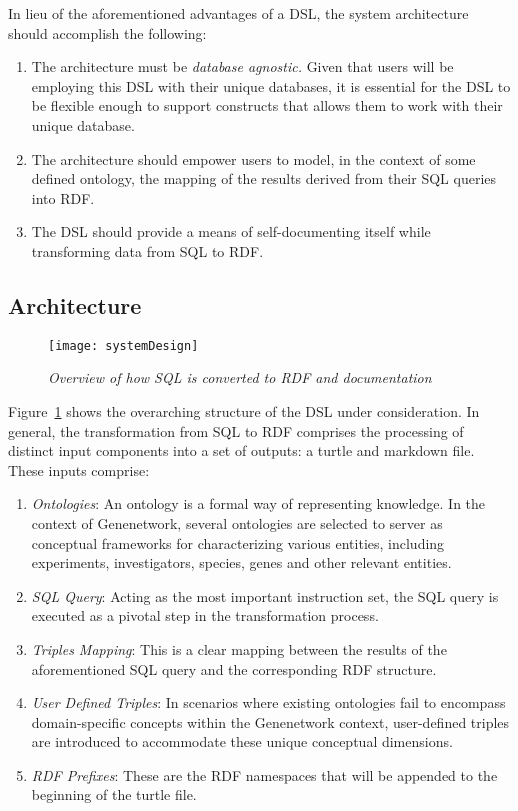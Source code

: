 In lieu of the aforementioned advantages of a DSL, the system architecture should accomplish the following:

\begin{enumerate}
\item The architecture must be \textit{database agnostic.}  Given that users will be employing this DSL with their unique databases, it is essential for the DSL to be flexible enough to support constructs that allows them to work with their unique database.
\item The architecture should empower users to model, in the context of some defined ontology, the mapping of the results derived from their SQL queries into RDF\@.
\item The DSL should provide a means of self-documenting itself while transforming data from SQL to RDF\@.
\end{enumerate}

\subsection{Architecture}
\begin{figure}[H]
  \centering
  \texttt{[image: systemDesign]}
  \caption{\textit{Overview of how SQL is converted to RDF and documentation}}\label{fig:system-diagram}
  \centering
\end{figure}

Figure~\ref{fig:system-diagram} shows the overarching structure of the DSL under consideration.  In general, the transformation from SQL to RDF comprises the processing of distinct input components into a set of outputs: a turtle and markdown file.  These inputs comprise:

\begin{enumerate}
\item \textit{Ontologies}: An ontology is a formal way of representing knowledge.  In the context of Genenetwork, several ontologies are selected to server as conceptual frameworks for characterizing various entities, including experiments, investigators, species, genes and other relevant entities.
\item \textit{SQL Query}: Acting as the most important instruction set, the SQL query is executed as a pivotal step in the transformation process.
\item \textit{Triples Mapping}: This is a clear mapping between the results of the aforementioned SQL query and the corresponding RDF structure.
\item \textit{User Defined Triples}: In scenarios where existing ontologies fail to encompass domain-specific concepts within the Genenetwork context, user-defined triples are introduced to accommodate these unique conceptual dimensions.
\item \textit{RDF Prefixes}: These are the RDF namespaces that will be appended to the beginning of the turtle file.
\end{enumerate}

